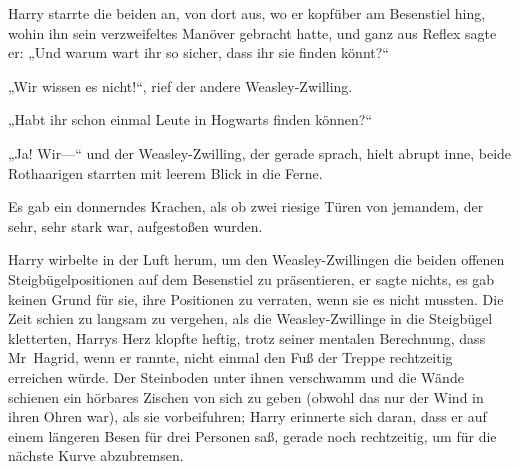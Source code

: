 Harry starrte die beiden an, von dort aus, wo er kopfüber am Besenstiel hing, wohin ihn sein verzweifeltes Manöver gebracht hatte, und ganz aus Reflex sagte er:
„Und warum wart ihr so sicher, dass ihr sie finden könnt?“

„Wir wissen es nicht!“, rief der andere Weasley-Zwilling.

„Habt ihr schon einmal Leute in Hogwarts finden können?“

„Ja! Wir—“ und der Weasley-Zwilling, der gerade sprach, hielt abrupt inne, beide Rothaarigen starrten mit leerem Blick in die Ferne.

Es gab ein donnerndes Krachen, als ob zwei riesige Türen von jemandem, der sehr, sehr stark war, aufgestoßen wurden.

Harry wirbelte in der Luft herum, um den Weasley-Zwillingen die beiden offenen Steigbügelpositionen auf dem Besenstiel zu präsentieren, er sagte nichts, es gab keinen Grund für sie, ihre Positionen zu verraten, wenn sie es nicht mussten. Die Zeit schien zu langsam zu vergehen, als die Weasley-Zwillinge in die Steigbügel kletterten, Harrys Herz klopfte heftig, trotz seiner mentalen Berechnung, dass Mr~Hagrid, wenn er rannte, nicht einmal den Fuß der Treppe rechtzeitig erreichen würde. Der Steinboden unter ihnen verschwamm und die Wände schienen ein hörbares Zischen von sich zu geben (obwohl das nur der Wind in ihren Ohren war), als sie vorbeifuhren; Harry erinnerte sich daran, dass er auf einem längeren Besen für drei Personen saß, gerade noch rechtzeitig, um für die nächste Kurve abzubremsen.

